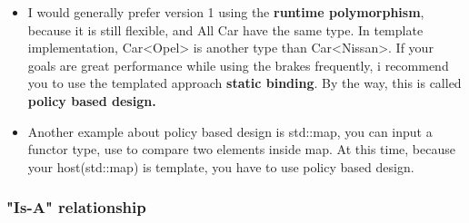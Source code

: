 \documentclass[a4paper,11pt,twoside]{book}
\begin{document}
\begin{itemize}
	\item I would generally prefer version 1 using the \textbf{runtime polymorphism}, because it is still flexible, and All Car  have the same type. In template implementation,  Car<Opel> is another type than Car<Nissan>. If your goals are great performance while using the brakes frequently, i recommend you to use the templated approach \textbf{static binding}. By the way, this is called \textbf{policy based design.}
	
	\item Another example about policy based design is std::map, you can input a functor type, use to compare two elements inside map. At this time, because your host(std::map) is template, you have to use policy based design.
\end{itemize}

\subsubsection{"Is-A" relationship}
\end{document}
